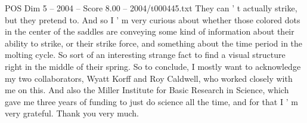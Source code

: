 \begin{textsample}{POS Dim 5 – 2004 – Score 8.00 – 2004/t000445.txt}
They can ' t actually strike, but they pretend to.
And so I ' m very curious about whether those colored dots in the center of the saddles are conveying some kind of information about their ability to strike, or their strike force, and something about the time period in the molting cycle.
So sort of an interesting strange fact to find a visual structure right in the middle of their spring.
So to conclude, I mostly want to acknowledge my two collaborators, Wyatt Korff and Roy Caldwell, who worked closely with me on this.
And also the Miller Institute for Basic Research in Science, which gave me three years of funding to just do science all the time, and for that I ' m very grateful.
Thank you very much.

\end{textsample}
